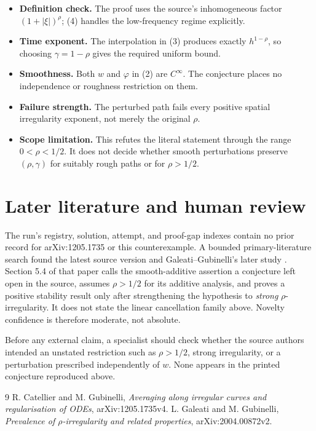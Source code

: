\documentclass[11pt]{article}
\begin{document}
\begin{itemize}
\item \textbf{Definition check.} The proof uses the source's inhomogeneous
factor $(1+|\xi|)^\rho$; (4) handles the low-frequency regime explicitly.
\item \textbf{Time exponent.} The interpolation in (3) produces exactly
$h^{1-\rho}$, so choosing $\gamma=1-\rho$ gives the required uniform bound.
\item \textbf{Smoothness.} Both $w$ and $\varphi$ in (2) are $C^\infty$.
The conjecture places no independence or roughness restriction on them.
\item \textbf{Failure strength.} The perturbed path fails every positive
spatial irregularity exponent, not merely the original $\rho$.
\item \textbf{Scope limitation.} This refutes the literal statement through
the range $0<\rho<1/2$. It does not decide whether smooth perturbations
preserve $(\rho,\gamma)$ for suitably rough paths or for $\rho>1/2$.
\end{itemize}

\section{Later literature and human review}

The run's registry, solution, attempt, and proof-gap indexes contain no prior
record for arXiv:1205.1735 or this counterexample. A bounded primary-literature
search found the latest source version and Galeati--Gubinelli's later study
\cite{GG}. Section 5.4 of that paper calls the smooth-additive assertion a
conjecture left open in the source, assumes $\rho>1/2$ for its additive
analysis, and proves a positive stability result only after strengthening the
hypothesis to \emph{strong} $\rho$-irregularity. It does not state the linear
cancellation family above. Novelty confidence is therefore moderate, not
absolute.

Before any external claim, a specialist should check whether the source
authors intended an unstated restriction such as $\rho>1/2$, strong
irregularity, or a perturbation prescribed independently of $w$. None appears
in the printed conjecture reproduced above.

\begin{thebibliography}{9}
 R. Catellier and M. Gubinelli,
\emph{Averaging along irregular curves and regularisation of ODEs},
arXiv:1205.1735v4.
 L. Galeati and M. Gubinelli,
\emph{Prevalence of $\rho$-irregularity and related properties},
arXiv:2004.00872v2.
\end{thebibliography}
\end{document}
